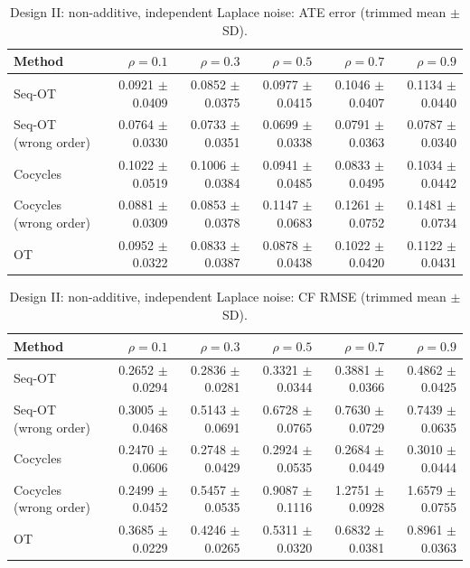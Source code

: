 \begin{table}[t]
\centering
\caption{Design II: non-additive, independent Laplace noise: ATE error (trimmed mean $\pm$ SD).}
\begin{tabular}{lrrrrr}
\toprule
Method & $\rho=0.1$ & $\rho=0.3$ & $\rho=0.5$ & $\rho=0.7$ & $\rho=0.9$ \\
\midrule
Seq-OT & 0.0921 $\pm$ 0.0409 & 0.0852 $\pm$ 0.0375 & 0.0977 $\pm$ 0.0415 & 0.1046 $\pm$ 0.0407 & 0.1134 $\pm$ 0.0440 \\
Seq-OT (wrong order) & 0.0764 $\pm$ 0.0330 & 0.0733 $\pm$ 0.0351 & 0.0699 $\pm$ 0.0338 & 0.0791 $\pm$ 0.0363 & 0.0787 $\pm$ 0.0340 \\
Cocycles & 0.1022 $\pm$ 0.0519 & 0.1006 $\pm$ 0.0384 & 0.0941 $\pm$ 0.0485 & 0.0833 $\pm$ 0.0495 & 0.1034 $\pm$ 0.0442 \\
Cocycles (wrong order) & 0.0881 $\pm$ 0.0309 & 0.0853 $\pm$ 0.0378 & 0.1147 $\pm$ 0.0683 & 0.1261 $\pm$ 0.0752 & 0.1481 $\pm$ 0.0734 \\
OT & 0.0952 $\pm$ 0.0322 & 0.0833 $\pm$ 0.0387 & 0.0878 $\pm$ 0.0438 & 0.1022 $\pm$ 0.0420 & 0.1122 $\pm$ 0.0431 \\
\bottomrule
\end{tabular}
\end{table}

\begin{table}[t]
\centering
\caption{Design II: non-additive, independent Laplace noise: CF RMSE (trimmed mean $\pm$ SD).}
\begin{tabular}{lrrrrr}
\toprule
Method & $\rho=0.1$ & $\rho=0.3$ & $\rho=0.5$ & $\rho=0.7$ & $\rho=0.9$ \\
\midrule
Seq-OT & 0.2652 $\pm$ 0.0294 & 0.2836 $\pm$ 0.0281 & 0.3321 $\pm$ 0.0344 & 0.3881 $\pm$ 0.0366 & 0.4862 $\pm$ 0.0425 \\
Seq-OT (wrong order) & 0.3005 $\pm$ 0.0468 & 0.5143 $\pm$ 0.0691 & 0.6728 $\pm$ 0.0765 & 0.7630 $\pm$ 0.0729 & 0.7439 $\pm$ 0.0635 \\
Cocycles & 0.2470 $\pm$ 0.0606 & 0.2748 $\pm$ 0.0429 & 0.2924 $\pm$ 0.0535 & 0.2684 $\pm$ 0.0449 & 0.3010 $\pm$ 0.0444 \\
Cocycles (wrong order) & 0.2499 $\pm$ 0.0452 & 0.5457 $\pm$ 0.0535 & 0.9087 $\pm$ 0.1116 & 1.2751 $\pm$ 0.0928 & 1.6579 $\pm$ 0.0755 \\
OT & 0.3685 $\pm$ 0.0229 & 0.4246 $\pm$ 0.0265 & 0.5311 $\pm$ 0.0320 & 0.6832 $\pm$ 0.0381 & 0.8961 $\pm$ 0.0363 \\
\bottomrule
\end{tabular}
\end{table}

